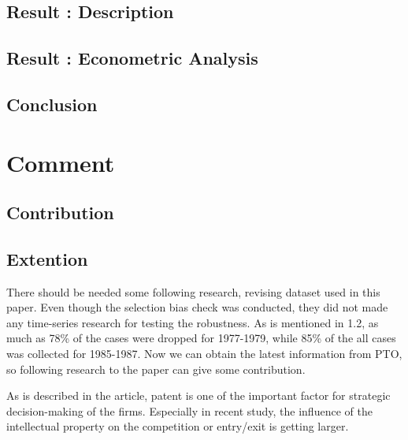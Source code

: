 \documentclass{jsarticle}[12pt]
\begin{document}
  \subsection{Result : Description}
  
  
  
  \subsection{Result : Econometric Analysis}
  
  
  
  \subsection{Conclusion}
  
  
 
 \section{Comment}
 
 
 
  \subsection{Contribution}
  
  
  
  \subsection{Extention}
  
  There should be needed some following research, revising dataset used in this paper. Even though the selection bias check was conducted, they did not made any time-series research for testing the robustness. As is mentioned in 1.2, as much as 78\% of the cases were dropped for 1977-1979, while 85\% of the all cases was collected for 1985-1987. Now we can obtain the latest information from PTO, so following research to the paper can give some contribution.
  
  As is described in the article, patent is one of the important factor for strategic decision-making of the firms. Especially in recent study, the influence of the intellectual property on the competition or entry/exit is getting larger.
\end{document}
